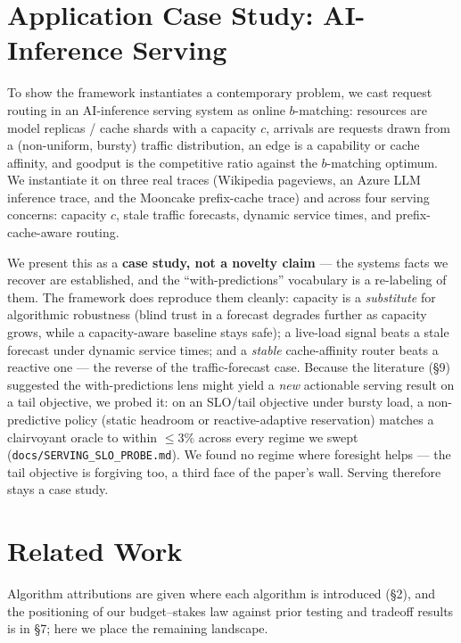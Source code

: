 \section{Application Case Study: AI-Inference
Serving}

To show the framework instantiates a contemporary problem, we cast
request routing in an AI-inference serving system as online
\(b\)-matching: resources are model replicas / cache shards with a
capacity \(c\), arrivals are requests drawn from a (non-uniform, bursty)
traffic distribution, an edge is a capability or cache affinity, and
goodput is the competitive ratio against the \(b\)-matching optimum. We
instantiate it on three real traces (Wikipedia pageviews, an Azure LLM
inference trace, and the Mooncake prefix-cache trace) and across four
serving concerns: capacity \(c\), stale traffic forecasts, dynamic
service times, and prefix-cache-aware routing.

We present this as a \textbf{case study, not a novelty claim} --- the
systems facts we recover are established, and the ``with-predictions''
vocabulary is a re-labeling of them. The framework does reproduce them
cleanly: capacity is a \emph{substitute} for algorithmic robustness
(blind trust in a forecast degrades further as capacity grows, while a
capacity-aware baseline stays safe); a live-load signal beats a stale
forecast under dynamic service times; and a \emph{stable} cache-affinity
router beats a reactive one --- the reverse of the traffic-forecast
case. Because the literature (§9) suggested the with-predictions lens
might yield a \emph{new} actionable serving result on a tail objective,
we probed it: on an SLO/tail objective under bursty load, a
non-predictive policy (static headroom or reactive-adaptive reservation)
matches a clairvoyant oracle to within \(\le 3\%\) across every regime
we swept (\texttt{docs/SERVING\_SLO\_PROBE.md}). We found no regime
where foresight helps --- the tail objective is forgiving too, a third
face of the paper's wall. Serving therefore stays a case study.

\section{Related Work}

Algorithm attributions are given where each algorithm is introduced
(§2), and the positioning of our budget--stakes law against prior
testing and tradeoff results is in §7; here we place the remaining
landscape.

